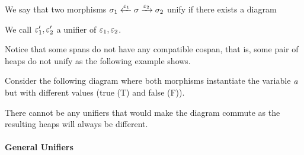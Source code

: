 \begin{definition}
    We say that two morphisms $\sigma_1 \xleftarrow{\varepsilon_1} \sigma \xrightarrow{\varepsilon_2} \sigma_2$ unify if there exists a diagram
    \begin{center}
    \end{center}
    We call $\varepsilon_1', \varepsilon_2'$ a unifier of $\varepsilon_1, \varepsilon_2$.
\end{definition}
Notice that some spans do not have any compatible cospan, that is, some pair of heaps do not unify as the following example shows.
\begin{example}
    Consider the following diagram where both morphisms instantiate the variable $\mathit{a}$ but with different values (true (T) and false (F)).
    \begin{center}
    \renewcommand\ndsize{9}
    \end{center}
    There cannot be any unifiers that would make the diagram commute as the resulting heaps will always be different.
\end{example}

\paragraph{General Unifiers}

